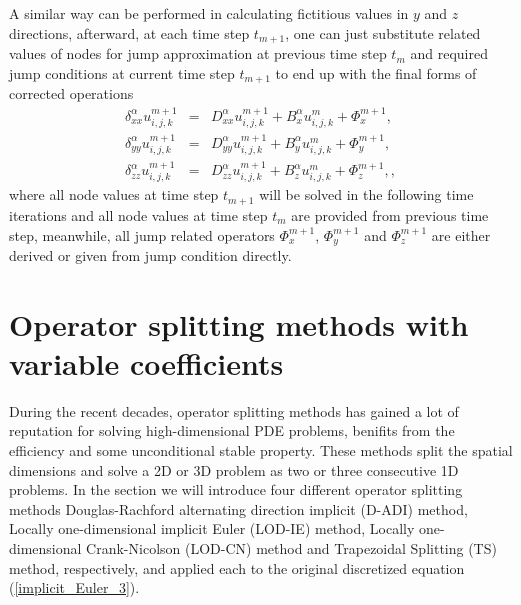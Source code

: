 \documentclass[dissertation]{uathesis}
\begin{document}
\begin{body}
\begin{flushleft}
\hspace{1cm} A similar way can be performed in calculating fictitious values in $y$ and $z$ directions, afterward, at each time step $t_{m+1}$, one can just substitute related values of nodes for jump approximation at previous time step $t_m$ and required jump conditions at current time step $t_{m+1}$ to end up with the final forms of corrected operations 
%
\begin{eqnarray} 
\delta^{\alpha}_{xx} u^{m+1}_{i,j,k} &=& D^{\alpha}_{xx} u^{m+1}_{i,j,k} + B^{\alpha}_{x} u^{m}_{i,j,k} + \Phi_{x}^{m+1}, \label{delta_xx_operator_3} \\ 
\delta^{\alpha}_{yy} u^{m+1}_{i,j,k} &=& D^{\alpha}_{yy} u^{m+1}_{i,j,k} + B^{\alpha}_{y} u^{m}_{i,j,k} + \Phi_{y}^{m+1}, \label{delta_yy_operator_3} \\
\delta^{\alpha}_{zz} u^{m+1}_{i,j,k} &=& D^{\alpha}_{zz} u^{m+1}_{i,j,k} + B^{\alpha}_{z} u^{m}_{i,j,k} + \Phi_{z}^{m+1}, \label{delta_zz_operator_3},
\end{eqnarray}
%
where all node values at time step $t_{m+1}$ will be solved in the following time iterations and all node values at time step $t_m$ are provided from previous time step, meanwhile, all jump related operators $\Phi_{x}^{m+1}$, $\Phi_{y}^{m+1}$ and $\Phi_{z}^{m+1}$ are either derived or given from jump condition directly.

\section{Operator splitting methods with variable coefficients}
\hspace{1cm} During the recent decades, operator splitting methods has gained a lot of reputation for solving high-dimensional PDE problems, benifits from the efficiency and some unconditional stable property. These methods split the spatial dimensions and solve a 2D or 3D problem as two or three consecutive 1D problems. In the section we will introduce four different operator splitting methods Douglas-Rachford alternating direction implicit (D-ADI) method, Locally one-dimensional implicit Euler (LOD-IE) method, Locally one-dimensional Crank-Nicolson (LOD-CN) method and Trapezoidal Splitting (TS) method, respectively, and applied each to the original discretized equation (\ref{implicit_Euler_3}).


\end{flushleft}
\end{body}
\end{document}
